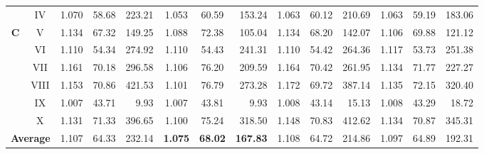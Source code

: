 \begin{sidewaystable}[h!]
\begin{center}
\begin{scriptsize}
\begin{tabular}{|c|c|c|c|r|c|c|r|c|c|r|c|c|r|}
           &    IV & 1.070 & 58.68 &  223.21 & 1.053 & 60.59 &  153.24 & 1.063 & 60.12 &  210.69 & 1.063 & 59.19 &  183.06 \\%
\textbf{C} &     V & 1.134 & 67.32 &  149.25 & 1.088 & 72.38 &  105.04 & 1.134 & 68.20 &  142.07 & 1.106 & 69.88 &  121.12 \\%
           &    VI & 1.110 & 54.34 &  274.92 & 1.110 & 54.43 &  241.31 & 1.110 & 54.42 &  264.36 & 1.117 & 53.73 &  251.38 \\%
           &   VII & 1.161 & 70.18 &  296.58 & 1.106 & 76.20 &  209.59 & 1.164 & 70.42 &  261.95 & 1.134 & 71.77 &  227.27 \\%
           &  VIII & 1.153 & 70.86 &  421.53 & 1.101 & 76.79 &  273.28 & 1.172 & 69.72 &  387.14 & 1.135 & 72.15 &  320.40 \\%
           &    IX & 1.007 & 43.71 &    9.93 & 1.007 & 43.81 &    9.93 & 1.008 & 43.14 &   15.13 & 1.008 & 43.29 &   18.72 \\%
           &     X & 1.131 & 71.33 &  396.65 & 1.100 & 75.24 &  318.50 & 1.148 & 70.83 &  412.62 & 1.134 & 70.87 &  345.31 \\\hline%
\multicolumn{2}{|c|}{\textbf{Average}} & 1.107 & 64.33 & 232.14 & \textbf{1.075} & \textbf{68.02} & \textbf{167.83}%
                                       & 1.108 & 64.72 & 214.86 & 1.097 & 64.89 & 192.31 \\\hline%
\end{tabular}
\end{scriptsize}
\end{center}
\end{sidewaystable}
